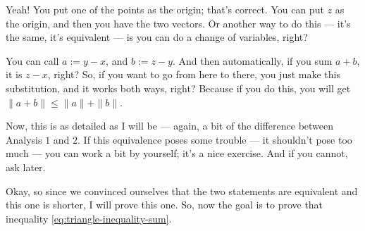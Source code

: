 \begin{spoken-clean}[00:55:50 - 00:57:09]
Yeah! You put one of the points as the origin; that's correct. You can put $z$ as the origin, and then you have the two vectors. Or another way to do this --- it's the same, it's equivalent --- is you can do a change of variables, right?

You can call $a := y - x$, and $b := z - y$. And then automatically, if you sum $a + b$, it is $z - x$, right? So, if you want to go from here to there, you just make this substitution, and it works both ways, right? Because if you do this, you will get $\|a + b\| \le \|a\| + \|b\|$.

Now, this is as detailed as I will be --- again, a bit of the difference between Analysis $1$ and $2$. If this equivalence poses some trouble --- it shouldn't pose too much --- you can work a bit by yourself; it's a nice exercise. And if you cannot, ask later.

Okay, so since we convinced ourselves that the two statements are equivalent and this one is shorter, I will prove this one. So, now the goal is to prove that inequality \eqref{eq:triangle-inequality-sum}.
\end{spoken-clean}

